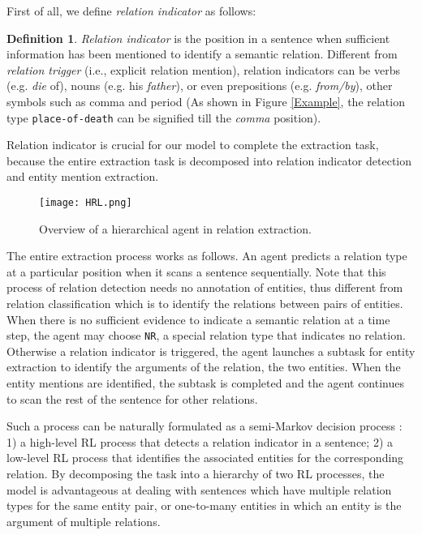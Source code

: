\documentclass[letterpaper]{article} \usepackage{aaai19}  \usepackage{times}  \usepackage{helvet}  \usepackage{courier}  \usepackage{url}  \usepackage{graphicx}  \frenchspacing  \setlength{\pdfpagewidth}{8.5in}  \setlength{\pdfpageheight}{11in}  \usepackage{amsfonts}
\theoremstyle{definition}
\newtheorem{defn}{Definition}[]
\begin{document}
First of all, we define \textit{relation indicator} as follows:
\begin{defn}
\textit{Relation indicator} is the position in a sentence when sufficient information has been mentioned to identify a semantic relation. Different from \textit{relation trigger} (i.e., explicit relation mention), relation indicators can be verbs (e.g. \textit{die} of), nouns (e.g. his \textit{father}), or even prepositions (e.g. \textit{from/by}), other symbols such as comma and period (As shown in Figure \ref{Example}, the relation type \texttt{place-of-death} can be signified till the {\it comma} position).
\label{define:relation_indicator}  \end{defn}
Relation indicator is crucial for our model to complete the extraction task, because the entire extraction task is decomposed into relation indicator detection and entity mention extraction.

\begin{figure}[!htp]
    \centering
    \texttt{[image: HRL.png]}
    \caption{Overview of a hierarchical agent in relation extraction.} \label{hierpolicy}
\end{figure}

The entire extraction process works as follows. An agent predicts a relation type at a particular position when it scans a sentence sequentially. Note that this process of relation detection needs no annotation of entities, thus different from relation classification which is to identify the relations between pairs of entities. When there is no sufficient evidence to indicate a semantic relation at a time step, the agent may choose \texttt{NR}, a special relation type that indicates no relation. Otherwise a relation indicator is triggered, the agent launches a subtask for entity extraction to identify the arguments of the relation, the two entities. When the entity mentions are identified, the subtask is completed and the agent continues to scan the rest of the sentence for other relations. 

Such a process can be naturally formulated as a semi-Markov decision process \cite{sutton1999between}: 1) a high-level RL process that detects a relation indicator in a sentence; 2) a low-level RL process that identifies the associated entities for the corresponding relation. 
By decomposing the task into a hierarchy of two RL processes, the model is advantageous at dealing with sentences which have multiple relation types for the same entity pair, or one-to-many entities in which an entity is the argument of multiple relations. 
\end{document}
